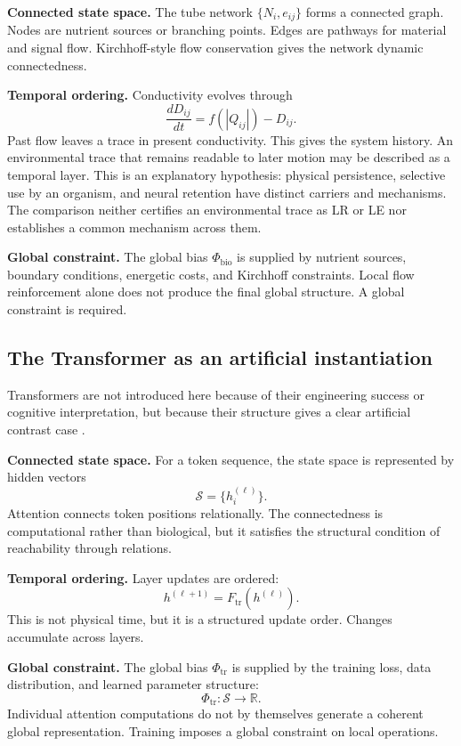 \textbf{Connected state space.}
The tube network \(\{N_i,e_{ij}\}\) forms a connected graph. Nodes are nutrient sources or branching points. Edges are pathways for material and signal flow. Kirchhoff-style flow conservation gives the network dynamic connectedness.

\textbf{Temporal ordering.}
Conductivity evolves through
\[
\frac{dD_{ij}}{dt}=f(|Q_{ij}|)-D_{ij}.
\]
Past flow leaves a trace in present conductivity. This gives the system history. An environmental trace that remains readable to later motion may be described as a temporal layer. This is an explanatory hypothesis: physical persistence, selective use by an organism, and neural retention have distinct carriers and mechanisms. The comparison neither certifies an environmental trace as LR or LE nor establishes a common mechanism across them.

\textbf{Global constraint.}
The global bias \(\Phi_{\mathrm{bio}}\) is supplied by nutrient sources, boundary conditions, energetic costs, and Kirchhoff constraints. Local flow reinforcement alone does not produce the final global structure. A global constraint is required.

\subsection{The Transformer as an artificial instantiation}

Transformers are not introduced here because of their engineering success or cognitive interpretation, but because their structure gives a clear artificial contrast case \citep{Vaswani2017}.

\textbf{Connected state space.}
For a token sequence, the state space is represented by hidden vectors
\[
\mathcal{S}=\{h_i^{(\ell)}\}.
\]
Attention connects token positions relationally. The connectedness is computational rather than biological, but it satisfies the structural condition of reachability through relations.

\textbf{Temporal ordering.}
Layer updates are ordered:
\[
h^{(\ell+1)}=F_{\mathrm{tr}}\!\left(h^{(\ell)}\right).
\]
This is not physical time, but it is a structured update order. Changes accumulate across layers.

\textbf{Global constraint.}
The global bias \(\Phi_{\mathrm{tr}}\) is supplied by the training loss, data distribution, and learned parameter structure:
\[
\Phi_{\mathrm{tr}}:\mathcal{S}\rightarrow\mathbb{R}.
\]
Individual attention computations do not by themselves generate a coherent global representation. Training imposes a global constraint on local operations.

